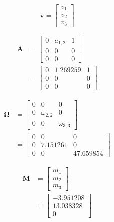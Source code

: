 \documentclass[
]{book}
\begin{document}
\begin{equation}
  \mathbf{v}
  =
  \begin{bmatrix}
    v_1 \\
    v_2 \\
    v_3
  \end{bmatrix}
\end{equation}

\begin{equation}
  \begin{split}
    \mathbf{A}
    &=
    \begin{bmatrix}
      0 & a_{1, 2} & 1 \\
      0 & 0        & 0 \\
      0 & 0        & 0
    \end{bmatrix} \\
    &=
    \begin{bmatrix}
      0 & 1.269259 & 1 \\
      0 & 0 & 0 \\
      0 & 0 & 0
    \end{bmatrix}
  \end{split}
\end{equation}

\begin{equation}
  \begin{split}
    \boldsymbol{\Omega}
    &=
    \begin{bmatrix}
      0 & 0             & 0 \\
      0 & \omega_{2, 2} & 0 \\
      0 & 0             & \omega_{3, 3}
    \end{bmatrix} \\
    &=
    \begin{bmatrix}
      0 & 0 & 0 \\
      0 & 7.151261 & 0 \\
      0 & 0 & 47.659854
    \end{bmatrix}
  \end{split}
\end{equation}

\begin{equation}
  \begin{split}
    \mathbf{M}
    &=
    \begin{bmatrix}
      m_1 \\
      m_2 \\
      m_3
    \end{bmatrix} \\
    &=
    \begin{bmatrix}
      -3.951208 \\
      13.038328 \\
      0
    \end{bmatrix}
  \end{split}
\end{equation}
\end{document}
